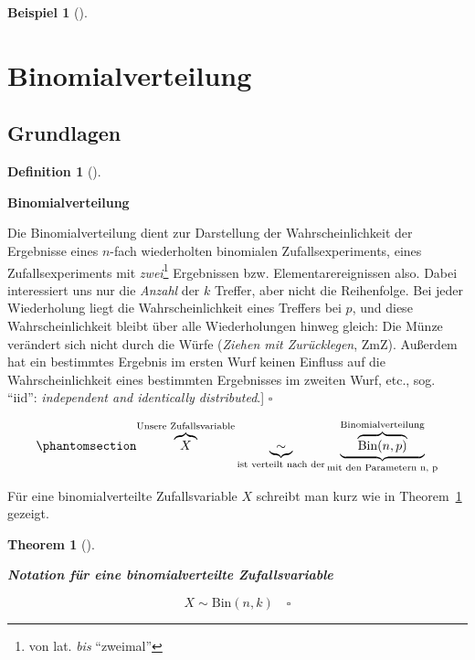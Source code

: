 \documentclass[
  ngerman,
  letterpaper,
  twoside,
  open=any]{scrbook}
\theoremstyle{definition}
\newtheorem{example}{Beispiel}[chapter]
\theoremstyle{plain}
\newtheorem{theorem}{Theorem}[chapter]
\theoremstyle{definition}
\theoremstyle{definition}
\newtheorem{definition}{Definition}[chapter]
\theoremstyle{remark}
\begin{document}
\begin{example}[]
\section{Binomialverteilung}\label{sec-bin-distrib}

\subsection{Grundlagen}\label{grundlagen-4}

\begin{definition}[]\protect\hypertarget{def-binvert}{}\label{def-binvert}

\textbf{Binomialverteilung}

Die Binomialverteilung dient zur Darstellung der Wahrscheinlichkeit der
Ergebnisse eines \(n\)-fach wiederholten binomialen Zufallsexperiments,
eines Zufallsexperiments mit \emph{zwei}\footnote{von lat. \emph{bis}
  \enquote{zweimal}} Ergebnissen bzw. Elementarereignissen also. Dabei
interessiert uns nur die \emph{Anzahl} der \(k\) Treffer, aber nicht die
Reihenfolge. Bei jeder Wiederholung liegt die Wahrscheinlichkeit eines
Treffers bei \(p\), und diese Wahrscheinlichkeit bleibt über alle
Wiederholungen hinweg gleich: Die Münze verändert sich nicht durch die
Würfe (\emph{Ziehen mit Zurücklegen}, ZmZ). Außerdem hat ein bestimmtes
Ergebnis im ersten Wurf keinen Einfluss auf die Wahrscheinlichkeit eines
bestimmten Ergebnisses im zweiten Wurf, etc., sog. \enquote{iid}:
\emph{independent and identically distributed}.{]} \(\square\)

\end{definition}

\begin{equation}\protect\phantomsection\label{eq-binvert}{\overbrace{X}^{\text{Unsere Zufallsvariable}} \underbrace{\sim}_{\text{ist verteilt nach der}} \underbrace{\overbrace{\text{Bin}(n, p)}^{\text{Binomialverteilung}}}_{\text{mit den Parametern n, p}}}\end{equation}

Für eine binomialverteilte Zufallsvariable \(X\) schreibt man kurz wie
in Theorem~\ref{thm-binvert} gezeigt.

\begin{theorem}[]\protect\hypertarget{thm-binvert}{}\label{thm-binvert}

\textbf{Notation für eine binomialverteilte Zufallsvariable}

\[X \sim \text{Bin}(n, k) \quad \square\]

\end{theorem}


\end{example}
\end{document}

